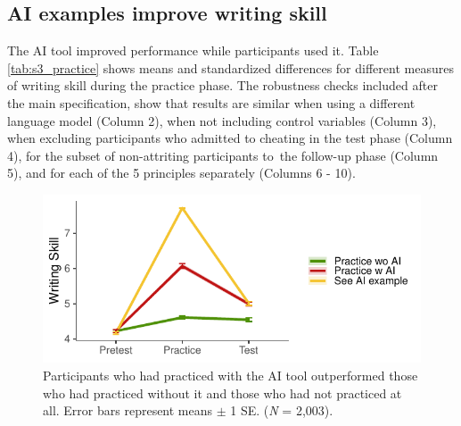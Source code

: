 \documentclass[11pt]{report}
\begin{document}
\begin{append}
\FloatBarrier
\subsection{AI examples improve writing skill}

The AI tool improved performance while participants used it. Table \ref{tab:s3_practice} shows means and standardized differences for different measures of writing skill during the practice phase. The robustness checks included after the main specification, show that results are similar when using a different language model (Column 2), when not including control variables (Column 3), when excluding participants who admitted to cheating in the test phase (Column 4), for the subset of non-attriting participants to the follow-up phase (Column 5), and for each of the 5 principles separately (Columns 6 - 10).


\begin{figure}[h]
    \centering
    \includegraphics[width=0.75\linewidth]{skill_lines_raw.pdf}
    \caption{Participants who had practiced with the AI tool outperformed those who had practiced without it and those who had not practiced at all.
    Error bars represent means $\pm$ 1 SE.
    (\textit{N} = 2,003).}
    \label{fig:s3sup}
\end{figure}


\end{append}
\end{document}
